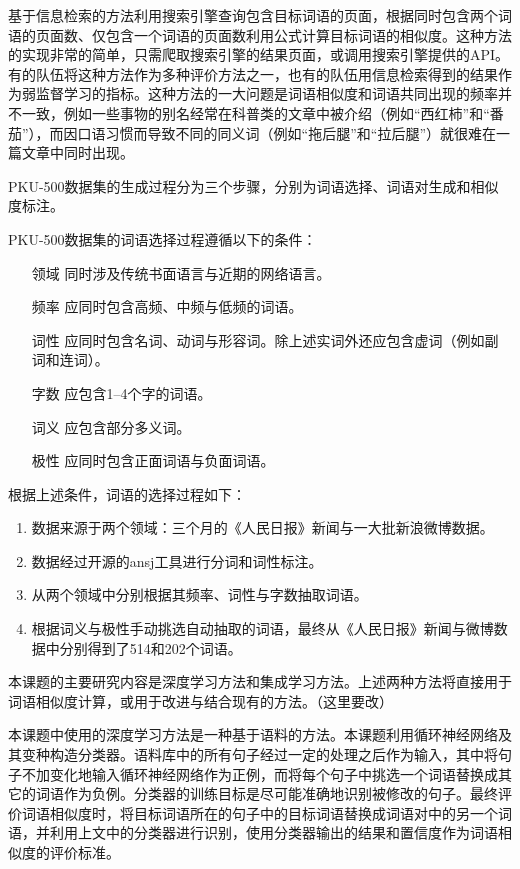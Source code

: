基于信息检索的方法利用搜索引擎查询包含目标词语的页面，根据同时包含两个词语的页面数、仅包含一个词语的页面数利用公式计算目标词语的相似度。这种方法的实现非常的简单，只需爬取搜索引擎的结果页面，或调用搜索引擎提供的API。有的队伍将这种方法作为多种评价方法之一，也有的队伍用信息检索得到的结果作为弱监督学习的指标。这种方法的一大问题是词语相似度和词语共同出现的频率并不一致，例如一些事物的别名经常在科普类的文章中被介绍（例如“西红柿”和“番茄”），而因口语习惯而导致不同的同义词（例如“拖后腿”和“拉后腿”）就很难在一篇文章中同时出现。

PKU-500数据集的生成过程分为三个步骤，分别为词语选择、词语对生成和相似度标注。

PKU-500数据集的词语选择过程遵循以下的条件：
\begin{itemize}
	\item[领域] 同时涉及传统书面语言与近期的网络语言。
	\item[频率] 应同时包含高频、中频与低频的词语。
	\item[词性] 应同时包含名词、动词与形容词。除上述实词外还应包含虚词（例如副词和连词）。
	\item[字数] 应包含1--4个字的词语。
	\item[词义] 应包含部分多义词。
	\item[极性] 应同时包含正面词语与负面词语。
\end{itemize}
根据上述条件，词语的选择过程如下：
\begin{enumerate}
	\item 数据来源于两个领域：三个月的《人民日报》新闻与一大批新浪微博数据。
	\item 数据经过开源的ansj工具进行分词和词性标注。
	\item 从两个领域中分别根据其频率、词性与字数抽取词语。
	\item 根据词义与极性手动挑选自动抽取的词语，最终从《人民日报》新闻与微博数据中分别得到了514和202个词语。
\end{enumerate}

本课题的主要研究内容是深度学习方法和集成学习方法。上述两种方法将直接用于词语相似度计算，或用于改进与结合现有的方法。（这里要改）

本课题中使用的深度学习方法是一种基于语料的方法。本课题利用循环神经网络及其变种构造分类器。语料库中的所有句子经过一定的处理之后作为输入，其中将句子不加变化地输入循环神经网络作为正例，而将每个句子中挑选一个词语替换成其它的词语作为负例。分类器的训练目标是尽可能准确地识别被修改的句子。最终评价词语相似度时，将目标词语所在的句子中的目标词语替换成词语对中的另一个词语，并利用上文中的分类器进行识别，使用分类器输出的结果和置信度作为词语相似度的评价标准。

